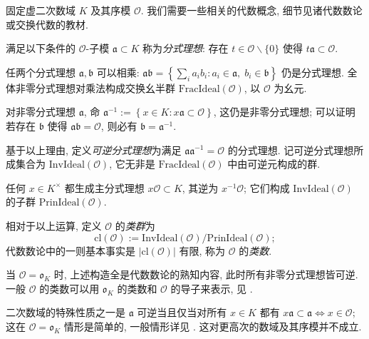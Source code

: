 固定虚二次数域 $K$ 及其序模 $\mathcal{O}$. 我们需要一些相关的代数概念, 细节见诸代数数论或交换代数的教材.
\begin{compactitem}
	\item 满足以下条件的 $\mathcal{O}$-子模 $\mathfrak{a} \subset K$ 称为\emph{分式理想}: 存在 $t \in \mathcal{O} \smallsetminus \{0\}$ 使得 $t\mathfrak{a} \subset \mathcal{O}$.
	\item 任两个分式理想 $\mathfrak{a}, \mathfrak{b}$ 可以相乘: $\mathfrak{a}\mathfrak{b} = \left\{ \sum_i a_i b_i : a_i \in \mathfrak{a}, \; b_i \in \mathfrak{b} \right\}$ 仍是分式理想. 全体非零分式理想对乘法构成交换幺半群 $\mathrm{FracIdeal}(\mathcal{O})$, 以 $\mathcal{O}$ 为幺元.
	\item 对非零分式理想 $\mathfrak{a}$, 命 $\mathfrak{a}^{-1} := \left\{ x \in K: x\mathfrak{a} \subset \mathcal{O} \right\}$, 这仍是非零分式理想; 可以证明若存在 $\mathfrak{b}$ 使得 $\mathfrak{a}\mathfrak{b} = \mathcal{O}$, 则必有 $\mathfrak{b} = \mathfrak{a}^{-1}$.
	\item 基于以上理由, 定义\emph{可逆分式理想}为满足 $\mathfrak{a}\mathfrak{a}^{-1} = \mathcal{O}$ 的分式理想. 记可逆分式理想所成集合为 $\mathrm{InvIdeal}(\mathcal{O})$, 它无非是 $\mathrm{FracIdeal}(\mathcal{O})$ 中由可逆元构成的群.
	\item 任何 $x \in K^\times$ 都生成主分式理想 $x\mathcal{O} \subset K$, 其逆为 $x^{-1} \mathcal{O}$; 它们构成 $\mathrm{InvIdeal}(\mathcal{O})$ 的子群 $\mathrm{PrinIdeal}(\mathcal{O})$.
	\item 相对于以上运算, 定义 $\mathcal{O}$ 的\emph{类群}为
	\[ \mathrm{cl}(\mathcal{O}) := \mathrm{InvIdeal}(\mathcal{O}) \big/ \mathrm{PrinIdeal}(\mathcal{O}); \]
	代数数论中的一则基本事实是 $\left| \mathrm{cl}(\mathcal{O}) \right|$ 有限, 称为 $\mathcal{O}$ 的\emph{类数}.
\end{compactitem}

当 $\mathcal{O} = \mathfrak{o}_K$ 时, 上述构造全是代数数论的熟知内容, 此时所有非零分式理想皆可逆. 一般 $\mathcal{O}$ 的类数可以用 $\mathfrak{o}_K$ 的类数和 $\mathcal{O}$ 的导子来表示, 见 \cite[Exercise 4.12]{Shi71}.

\begin{remark}\label{rem:quadratic-order}
	二次数域的特殊性质之一是 $\mathfrak{a}$ 可逆当且仅当对所有 $x \in K$ 都有 $x\mathfrak{a} \subset \mathfrak{a} \iff x \in \mathcal{O}$; 这在 $\mathcal{O} = \mathfrak{o}_K$ 情形是简单的, 一般情形详见 \cite[Corollary 4.4]{Kei}. 这对更高次的数域及其序模并不成立.
\end{remark}

